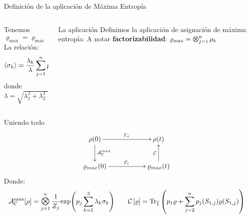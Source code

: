 \begin{frame}{Definición de la aplicación de Máxima Entropía}
    \begin{columns}
        \begin{column}{0.5\textwidth}
            Tenemos
            \begin{equation}
                \varrho_{\max}=\varrho_{\max}(\lambda_{1},\lambda_{2},\lambda_{3})\nonumber
            \end{equation}\pause
            La relación:
            \begin{equation}
                \expval{\sigma_{k}}=\frac{\lambda_{k}}{\lambda}\sum_{j=1}^{n}p_{j}\tanh(p_{j}\lambda)\nonumber
            \end{equation}\pause
            donde $\lambda=\sqrt{\lambda_{1}^{2}+\lambda_{2}^{2}+\lambda_{3}^{2}}$
        \end{column}
        \pause
        \begin{column}{0.5\textwidth}
            \begin{block}{La aplicación}
            Definimos la aplicación de asignación de máxima entropía:\pause
                A notar \textbf{factorizabilidad}: $\varrho_{\max}=\Motimes_{j=1}^{n}\rho_{k}$
            \end{block}
        \end{column}
    \end{columns}
\end{frame}


\begin{frame}{Uniendo todo}
    \begin{displaymath}
        \xymatrix{
          {\rho(0)} \ar[rr]^{\Gamma_{t}} \ar[d]^{\mcA^{max}_{\mcC}}
          && {\rho(t)}\\
          {\varrho_{max}(0)} \ar[rr]^{\mcE_{t}}
          && {\varrho_{max}(t)} \ar[u]^{\mcC}
        }
      \end{displaymath}\pause
      Donde:
        \begin{equation}
            \mcA_{\mcC}^{\max}[\rho]=\Motimes_{j=1}^{n}\frac{1}{Z_{j}}\text{exp}\qty(p_{j}\sum_{k=1}^{3}\lambda_{k}\sigma_{k}) \qquad \pause \CG{\varrho}=\Tr_{\overline{1}}\qty(p_{1}\varrho+\sum_{j=2}^{n}p_{j}(S_{1,j})\varrho(S_{1,j}))\nonumber
        \end{equation}\pause
        \begin{center}
        \end{center}
\end{frame}
